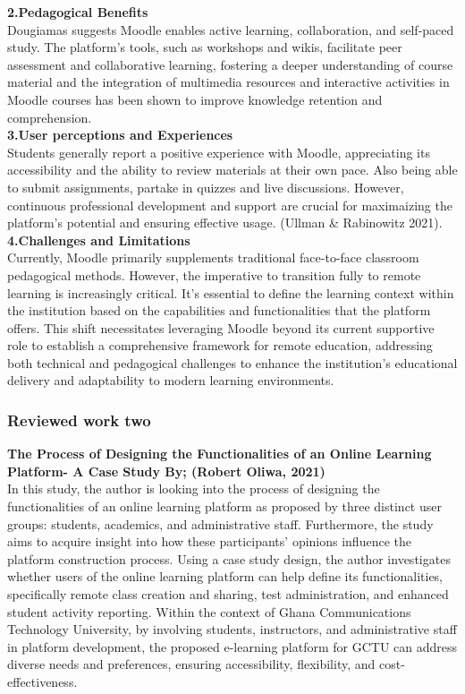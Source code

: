 \documentclass[a4paper,12pt]{article}  %
\begin{document}
\textbf{2.Pedagogical Benefits}\\
Dougiamas suggests Moodle enables active learning, collaboration, and self-paced study. The platform's tools, such as workshops and wikis, facilitate peer assessment and collaborative learning, fostering a deeper understanding of course material and the integration of  multimedia resources and interactive activities in Moodle courses has been shown to improve knowledge retention and comprehension.\\

\textbf{3.User perceptions and Experiences}\\
Students generally report a positive experience with Moodle, appreciating its accessibility and the ability to review materials at their own pace. Also being able to submit assignments, partake in quizzes and live discussions. However, continuous professional development and support are crucial for maximaizing the platform’s potential and ensuring effective usage. (Ullman \& Rabinowitz 2021).\\

\textbf{4.Challenges and Limitations}\\
Currently, Moodle primarily supplements traditional face-to-face classroom pedagogical methods. However, the imperative to transition fully to remote learning is increasingly critical. It's essential to define the learning context within the institution based on the capabilities and functionalities that the platform offers. This shift necessitates leveraging Moodle beyond its current supportive role to establish a comprehensive framework for remote education, addressing both technical and pedagogical challenges to enhance the institution's educational delivery and adaptability to modern learning environments.\\

\subsubsection{ Reviewed work two}
\large\textbf{The Process of Designing the Functionalities of an Online Learning Platform- A Case Study By; (Robert Oliwa, 2021)}\\

In this study, the author is looking into the process of designing the
functionalities of an online learning platform as proposed by three distinct
user groups: students, academics, and administrative staff. Furthermore, the
study aims to acquire insight into how these participants' opinions influence
the platform construction process. Using a case study design, the author
investigates whether users of the online learning platform can help define its
functionalities, specifically remote class creation and sharing, test
administration, and enhanced student activity reporting. Within the context of
Ghana Communications Technology University, by involving students, instructors,
and administrative staff in platform development, the proposed e-learning
platform for GCTU can address diverse needs and preferences, ensuring
accessibility, flexibility, and cost-effectiveness.\cite{oliwa2021process} \\
\end{document}
